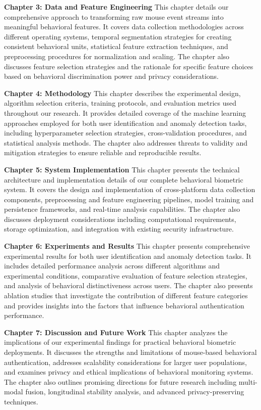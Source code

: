 \documentclass[
  12pt,
  a4paper,
]{report}
\begin{document}
\textbf{Chapter 3: Data and Feature Engineering} This chapter details
our comprehensive approach to transforming raw mouse event streams into
meaningful behavioral features. It covers data collection methodologies
across different operating systems, temporal segmentation strategies for
creating consistent behavioral units, statistical feature extraction
techniques, and preprocessing procedures for normalization and scaling.
The chapter also discusses feature selection strategies and the
rationale for specific feature choices based on behavioral
discrimination power and privacy considerations.

\textbf{Chapter 4: Methodology} This chapter describes the experimental
design, algorithm selection criteria, training protocols, and evaluation
metrics used throughout our research. It provides detailed coverage of
the machine learning approaches employed for both user identification
and anomaly detection tasks, including hyperparameter selection
strategies, cross-validation procedures, and statistical analysis
methods. The chapter also addresses threats to validity and mitigation
strategies to ensure reliable and reproducible results.

\textbf{Chapter 5: System Implementation} This chapter presents the
technical architecture and implementation details of our complete
behavioral biometric system. It covers the design and implementation of
cross-platform data collection components, preprocessing and feature
engineering pipelines, model training and persistence frameworks, and
real-time analysis capabilities. The chapter also discusses deployment
considerations including computational requirements, storage
optimization, and integration with existing security infrastructure.

\textbf{Chapter 6: Experiments and Results} This chapter presents
comprehensive experimental results for both user identification and
anomaly detection tasks. It includes detailed performance analysis
across different algorithms and experimental conditions, comparative
evaluation of feature selection strategies, and analysis of behavioral
distinctiveness across users. The chapter also presents ablation studies
that investigate the contribution of different feature categories and
provides insights into the factors that influence behavioral
authentication performance.

\textbf{Chapter 7: Discussion and Future Work} This chapter analyzes the
implications of our experimental findings for practical behavioral
biometric deployments. It discusses the strengths and limitations of
mouse-based behavioral authentication, addresses scalability
considerations for larger user populations, and examines privacy and
ethical implications of behavioral monitoring systems. The chapter also
outlines promising directions for future research including multi-modal
fusion, longitudinal stability analysis, and advanced privacy-preserving
techniques.
\end{document}
